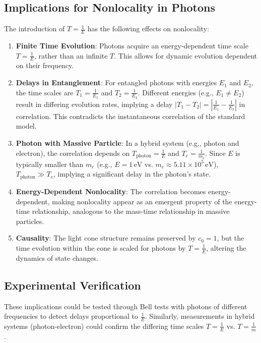 \documentclass[a4paper,12pt]{article}
\begin{document}
	\subsection{Implications for Nonlocality in Photons}
	The introduction of \( T = \frac{1}{E} \) has the following effects on nonlocality:
	
	\begin{enumerate}
		\item \textbf{Finite Time Evolution}: Photons acquire an energy-dependent time scale \( T = \frac{1}{E} \), rather than an infinite \( T \). This allows for dynamic evolution dependent on their frequency.
		
		\item \textbf{Delays in Entanglement}: For entangled photons with energies \( E_1 \) and \( E_2 \), the time scales are \( T_1 = \frac{1}{E_1} \) and \( T_2 = \frac{1}{E_2} \). Different energies (e.g., \( E_1 \neq E_2 \)) result in differing evolution rates, implying a delay \( |T_1 - T_2| = \left| \frac{1}{E_1} - \frac{1}{E_2} \right| \) in correlation. This contradicts the instantaneous correlation of the standard model.
		
		\item \textbf{Photon with Massive Particle}: In a hybrid system (e.g., photon and electron), the correlation depends on \( T_\text{photon} = \frac{1}{E} \) and \( T_e = \frac{1}{m_e} \). Since \( E \) is typically smaller than \( m_e \) (e.g., \( E = 1 \, \text{eV} \) vs. \( m_e \approx 5.11 \times 10^5 \, \text{eV} \)), \( T_\text{photon} \gg T_e \), implying a significant delay in the photon’s state.
		
		\item \textbf{Energy-Dependent Nonlocality}: The correlation becomes energy-dependent, making nonlocality appear as an emergent property of the energy-time relationship, analogous to the mass-time relationship in massive particles.
		
		\item \textbf{Causality}: The light cone structure remains preserved by \( c_0 = 1 \), but the time evolution within the cone is scaled for photons by \( T = \frac{1}{E} \), altering the dynamics of state changes.
	\end{enumerate}
	
	\subsection{Experimental Verification}
	These implications could be tested through Bell tests with photons of different frequencies to detect delays proportional to \( \frac{1}{E} \). Similarly, measurements in hybrid systems (photon-electron) could confirm the differing time scales \( T = \frac{1}{E} \) vs. \( T = \frac{1}{m} \).
	
\end{document}
